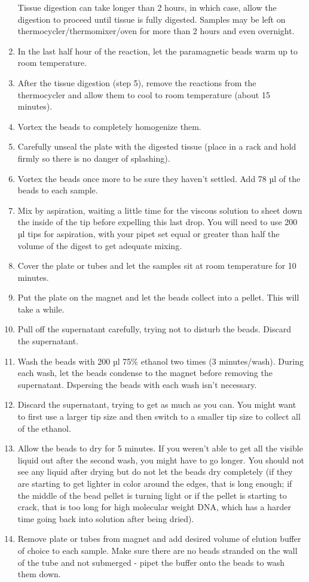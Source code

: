 \documentclass[
  letterpaper,
  DIV=11,
  numbers=noendperiod]{scrreprt}
\begin{document}
\begin{enumerate}
\begin{tcolorbox}
  Tissue digestion can take longer than 2 hours, in which case, allow
  the digestion to proceed until tissue is fully digested. Samples may
  be left on thermocycler/thermomixer/oven for more than 2 hours and
  even overnight.

  \end{tcolorbox}
\item
  In the last half hour of the reaction, let the paramagnetic beads warm
  up to room temperature.
\item
  After the tissue digestion (step 5), remove the reactions from the
  thermocycler and allow them to cool to room temperature (about 15
  minutes).
\item
  Vortex the beads to completely homogenize them.
\item
  Carefully unseal the plate with the digested tissue (place in a rack
  and hold firmly so there is no danger of splashing).
\item
  Vortex the beads once more to be sure they haven't settled. Add 78 µl
  of the beads to each sample.
\item
  Mix by aspiration, waiting a little time for the viscous solution to
  sheet down the inside of the tip before expelling this last drop. You
  will need to use 200 µl tips for aspiration, with your pipet set equal
  or greater than half the volume of the digest to get adequate mixing.
\item
  Cover the plate or tubes and let the samples sit at room temperature
  for 10 minutes.
\item
  Put the plate on the magnet and let the beads collect into a pellet.
  This will take a while.
\item
  Pull off the supernatant carefully, trying not to disturb the beads.
  Discard the supernatant.
\item
  Wash the beads with 200 µl 75\% ethanol two times (3 minutes/wash).
  During each wash, let the beads condense to the magnet before removing
  the supernatant. Dspersing the beads with each wash isn't necessary.
\item
  Discard the supernatant, trying to get as much as you can. You might
  want to first use a larger tip size and then switch to a smaller tip
  size to collect all of the ethanol.
\item
  Allow the beads to dry for 5 minutes. If you weren't able to get all
  the visible liquid out after the second wash, you might have to go
  longer. You should not see any liquid after drying but do not let the
  beads dry completely (if they are starting to get lighter in color
  around the edges, that is long enough; if the middle of the bead
  pellet is turning light or if the pellet is starting to crack, that is
  too long for high molecular weight DNA, which has a harder time going
  back into solution after being dried).
\item
  Remove plate or tubes from magnet and add desired volume of elution
  buffer of choice to each sample. Make sure there are no beads stranded
  on the wall of the tube and not submerged - pipet the buffer onto the
  beads to wash them down.


\end{enumerate}
\end{document}
